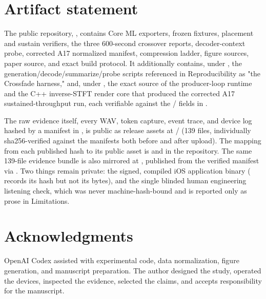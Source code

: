 \documentclass[10pt]{article}
\begin{document}
\section{Artifact statement}
The public repository, \texttt{}, contains Core ML exporters, frozen fixtures, placement and sustain verifiers, the three 600-second crossover reports, decoder-context probe, corrected A17 normalized manifest, compression ladder, figure sources, paper source, and exact build protocol. It additionally contains, under \texttt{}, the generation/decode/summarize/probe scripts referenced in Reproducibility as "the Crossfade harness," and, under \texttt{}, the exact source of the producer-loop runtime and the C++ inverse-STFT render core that produced the corrected A17 sustained-throughput run, each verifiable against the \texttt{} / \texttt{} fields in \texttt{}.

The raw evidence itself, every WAV, token capture, event trace, and device log hashed by a manifest in \texttt{}, is public as release assets at \texttt{} / \texttt{} (139 files, individually sha256-verified against the manifests both before and after upload). The mapping from each published hash to its public asset is \texttt{} and \texttt{} in the repository. The same 139-file evidence bundle is also mirrored at \texttt{}, published from the verified manifest via \texttt{}. Two things remain private: the signed, compiled iOS application binary (\texttt{} records its hash but not its bytes), and the single blinded human engineering listening check, which was never machine-hash-bound and is reported only as prose in Limitations.

\section{Acknowledgments}
OpenAI Codex assisted with experimental code, data normalization, figure generation, and manuscript preparation. The author designed the study, operated the devices, inspected the evidence, selected the claims, and accepts responsibility for the manuscript.
\end{document}
